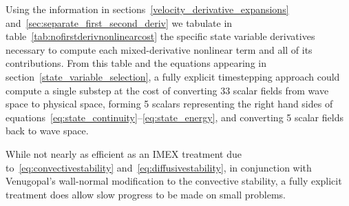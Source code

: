 \documentclass[letterpaper,11pt,nointlimits,reqno,draft]{amsart}
\begin{document}
Using the information in sections~\ref{velocity_derivative_expansions}
and~\ref{sec:separate_first_second_deriv} we tabulate in
table~\vref{tab:nofirstderivnonlinearcost} the specific state variable
derivatives necessary to compute each mixed-derivative nonlinear term and all
of its contributions.  From this table and the equations appearing in
section~\ref{state_variable_selection}, a fully explicit timestepping approach
could compute a single substep at the cost of converting 33 scalar fields from
wave space to physical space, forming 5 scalars representing the right hand
sides of equations~\eqref{eq:state_continuity}--\eqref{eq:state_energy}, and
converting 5 scalar fields back to wave space.

While not nearly as efficient as an IMEX treatment due
to~\eqref{eq:convectivestability} and~\eqref{eq:diffusivestability}, in
conjunction with Venugopal's wall-normal modification to the convective
stability, a fully explicit treatment does allow slow progress to be made on
small problems.
\end{document}

